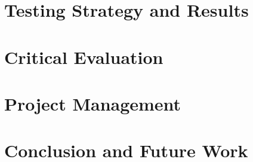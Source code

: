 \documentclass[12pt,a4paper]{report}
\begin{document}
	\chapter{Testing Strategy and Results}
	
	
	\chapter{Critical Evaluation}
	
	
	\chapter{Project Management}
	
	
	\chapter{Conclusion and Future Work}
	
	
	
	
	
	{}
	
\end{document}
